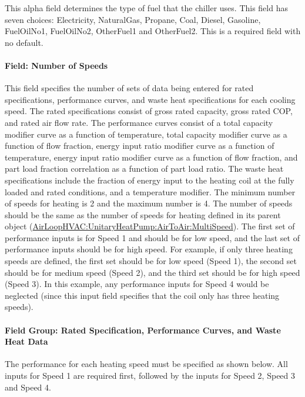 This alpha field determines the type of fuel that the chiller uses. This field has seven choices: Electricity, NaturalGas, Propane, Coal, Diesel, Gasoline, FuelOilNo1, FuelOilNo2, OtherFuel1 and OtherFuel2. This is a required field with no default.

\paragraph{Field: Number of Speeds}\label{field-number-of-speeds-2}

This field specifies the number of sets of data being entered for rated specifications, performance curves, and waste heat specifications for each cooling speed. The rated specifications consist of gross rated capacity, gross rated COP, and rated air flow rate. The performance curves consist of a total capacity modifier curve as a function of temperature, total capacity modifier curve as a function of flow fraction, energy input ratio modifier curve as a function of temperature, energy input ratio modifier curve as a function of flow fraction, and part load fraction correlation as a function of part load ratio. The waste heat specifications include the fraction of energy input to the heating coil at the fully loaded and rated conditions, and a temperature modifier. The minimum number of speeds for heating is 2 and the maximum number is 4. The number of speeds should be the same as the number of speeds for heating defined in its parent object (\hyperref[airloophvacunitaryheatpumpairtoairmultispeed]{AirLoopHVAC:UnitaryHeatPump:AirToAir:MultiSpeed}). The first set of performance inputs is for Speed 1 and should be for low speed, and the last set of performance inputs should be for high speed. For example, if only three heating speeds are defined, the first set should be for low speed (Speed 1), the second set should be for medium speed (Speed 2), and the third set should be for high speed (Speed 3). In this example, any performance inputs for Speed 4 would be neglected (since this input field specifies that the coil only has three heating speeds).

\paragraph{Field Group: Rated Specification, Performance Curves, and Waste Heat Data}\label{field-group-rated-specification-performance-curves-and-waste-heat-data}

The performance for each heating speed must be specified as shown below. All inputs for Speed 1 are required first, followed by the inputs for Speed 2, Speed 3 and Speed 4.

